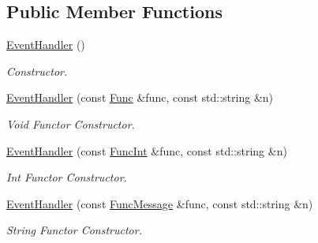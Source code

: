 \subsection*{Public Member Functions}
\begin{DoxyCompactItemize}
\item 
\mbox{\label{class_event_handler_a8fe27b69582cce5c6a89a0b134bc8158}} 
\mbox{\hyperlink{class_event_handler_a8fe27b69582cce5c6a89a0b134bc8158}{Event\+Handler}} ()
\begin{DoxyCompactList}\small\item\em Constructor. \end{DoxyCompactList}\item 
\mbox{\label{class_event_handler_ac5aa9716cd85cf8d1a642b39da067c68}} 
\mbox{\hyperlink{class_event_handler_ac5aa9716cd85cf8d1a642b39da067c68}{Event\+Handler}} (const \mbox{\hyperlink{class_event_handler_af1c003b45c76eb6eb0852801a997561b}{Func}} \&func, const std\+::string \&n)
\begin{DoxyCompactList}\small\item\em Void Functor Constructor. \end{DoxyCompactList}\item 
\mbox{\label{class_event_handler_ab407fade3b0f1feb9e7db43007dcac0c}} 
\mbox{\hyperlink{class_event_handler_ab407fade3b0f1feb9e7db43007dcac0c}{Event\+Handler}} (const \mbox{\hyperlink{class_event_handler_afc053859d1bdb89bd10f01ff22c99fed}{Func\+Int}} \&func, const std\+::string \&n)
\begin{DoxyCompactList}\small\item\em Int Functor Constructor. \end{DoxyCompactList}\item 
\mbox{\label{class_event_handler_a636fa04a3de981fad47973d8a4a1f419}} 
\mbox{\hyperlink{class_event_handler_a636fa04a3de981fad47973d8a4a1f419}{Event\+Handler}} (const \mbox{\hyperlink{class_event_handler_a21c76d0c722afe4925c87aa3544e2ce6}{Func\+Message}} \&func, const std\+::string \&n)
\begin{DoxyCompactList}\small\item\em String Functor Constructor. \end{DoxyCompactList}\item 
\mbox{\label{class_event_handler_aeb54e46cc16b35a2f3ced7cdc31f3d55}} 

\end{DoxyCompactItemize}
